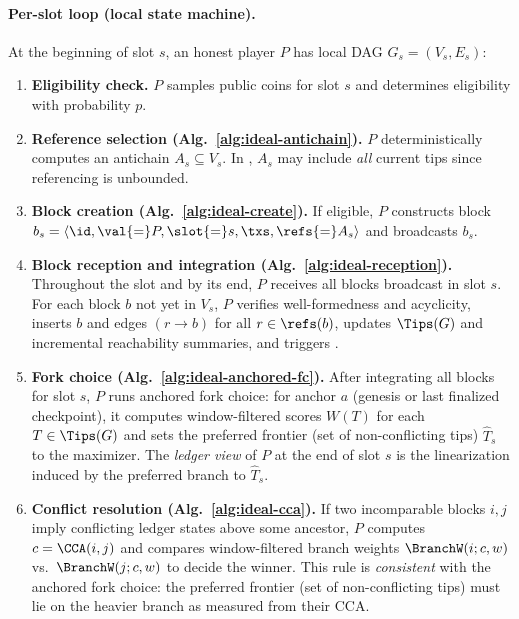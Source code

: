 \paragraph{Per-slot loop (local state machine).}
At the beginning of slot $s$, an honest player $P$ has local DAG $G_s=(V_s,E_s)$:
\begin{enumerate}
  \item \textbf{Eligibility check.} $P$ samples public coins for slot $s$ and determines eligibility with probability $p$. %
  \item \textbf{Reference selection (Alg.~\ref{alg:ideal-antichain}).} $P$ deterministically computes an antichain $A_s\subseteq V_s$. In \ProjIdeal, $A_s$ may include \emph{all} current tips since referencing is unbounded.
  \item \textbf{Block creation (Alg.~\ref{alg:ideal-create}).} If eligible, $P$ constructs block $b_s=\langle \id,\val{=}P,\slot{=}s,\txs,\refs{=}A_s\rangle$ and broadcasts $b_s$.
  \item \textbf{Block reception and integration (Alg.~\ref{alg:ideal-reception}).} Throughout the slot and by its end, $P$ receives all blocks broadcast in slot $s$. For each block $b$ not yet in $V_s$, $P$ verifies well-formedness and acyclicity, inserts $b$ and edges $(r\to b)$ for all $r\in\refs(b)$, updates $\Tips(G)$ and incremental reachability summaries, and triggers \ForkChoiceUpdate.
  \item \textbf{Fork choice (Alg.~\ref{alg:ideal-anchored-fc}).} After integrating all blocks for slot $s$, $P$ runs anchored fork choice: for anchor $a$ (genesis or last finalized checkpoint), it computes window-filtered scores $W(T)$ for each $T\in\Tips(G)$ and sets the preferred frontier (set of non-conflicting tips) $\hat{T}_s$ to the maximizer. The \emph{ledger view} of $P$ at the end of slot $s$ is the linearization induced by the preferred branch to $\hat{T}_s$.
  \item \textbf{Conflict resolution (Alg.~\ref{alg:ideal-cca}).} If two incomparable blocks $i,j$ imply conflicting ledger states above some ancestor, $P$ computes $c=\CCA(i,j)$ and compares window-filtered branch weights $\BranchW(i;c,w)$ vs.\ $\BranchW(j;c,w)$ to decide the winner. This rule is \emph{consistent} with the anchored fork choice: the preferred frontier (set of non-conflicting tips) must lie on the heavier branch as measured from their CCA.
\end{enumerate}




